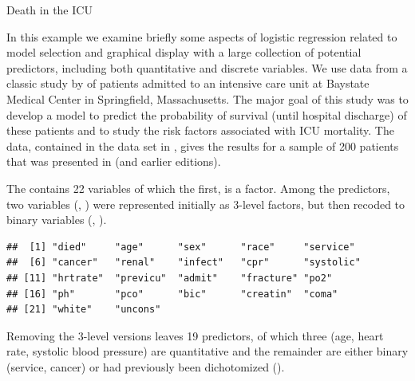 \documentclass[11pt]{book}
\renewenvironment{knitrout}{\small\renewcommand{\baselinestretch}{.85}}{} %
\begin{document}
\begin{Example}[icu1]{Death in the ICU}

In this example we examine briefly some aspects of logistic regression
related to model selection and graphical display with a large collection
of potential predictors, including both 
quantitative and discrete variables.
We use data from a classic study by
\citet{Lemeshow-etal:88} of patients admitted to an intensive care unit at
Baystate Medical Center in Springfield,
Massachusetts.  The major goal of this study was to develop a 
model to predict the probability of survival (until hospital
discharge) of these patients and to study the risk factors associated with 
ICU mortality.
The data, contained in the data set  in ,
gives the results for a sample of 200 patients 
that was presented in \citet{HosmerLemeshowSturdivant:2013}
(and earlier editions).

The  contains 22 variables of which the first, 
is a factor.  Among the predictors, two variables (, )
were represented initially as 3-level factors, but then recoded to
binary variables (, ).  
\begin{knitrout}
\color{fgcolor}\begin{kframe}
\begin{alltt}
\hlstd{(}\hlstd{,} \hlstd{=}\hlstd{)}
\end{alltt}
\begin{verbatim}
##  [1] "died"     "age"      "sex"      "race"     "service" 
##  [6] "cancer"   "renal"    "infect"   "cpr"      "systolic"
## [11] "hrtrate"  "previcu"  "admit"    "fracture" "po2"     
## [16] "ph"       "pco"      "bic"      "creatin"  "coma"    
## [21] "white"    "uncons"
\end{verbatim}
\begin{alltt}
 \hlkwb{<-} \hlstd{ICU[,}\hlopt{-}\hlstd{(}\hlstd{,} \hlstd{)]}  
\end{alltt}
\end{kframe}
\end{knitrout}
Removing the 3-level versions leaves 19 predictors, of which three
(age, heart rate, systolic blood pressure) are quantitative
and the remainder are either binary  (service, cancer) or had
previously been dichotomized ().


\end{Example}
\end{document}
